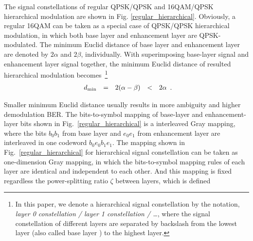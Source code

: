 \documentclass[10pt,fleqn, twocolumn]{IEEEtran}
\begin{document}
The signal constellations of regular QPSK/QPSK and 16QAM/QPSK
hierarchical modulation are shown in Fig.
\ref{regular_hierarchical}. Obviously, a regular 16QAM can be
taken as a special case of QPSK/QPSK hierarchical modulation, in
which both base layer and enhancement layer are QPSK-modulated.
The minimum Euclid distance of base layer and enhancement layer
are denoted by $2\alpha$ and $2\beta$, individually. With
superimposing base-layer signal and enhancement layer signal
together, the minimum Euclid distance of resulted hierarchical
modulation becomes~\footnote{In this paper, we denote a
hierarchical signal constellation by the notation, {\em layer 0
constellation / layer 1 constellation / \ldots}, where the signal
constellation of different layers are separated by backslash from
the lowest layer (also called base layer ) to the highest layer. }
\begin{equation}
\begin{array}{rcccl}
d_{\rm min}& = & 2(\alpha-\beta) & <& 2\alpha
\end{array}.\label{Regular_MED}
\end{equation}
\begin{figure}
\end{figure}
\noindent Smaller minimum Euclid distance usually results in more
ambiguity and higher demodulation BER. The bits-to-symbol mapping
of base-layer and enhancement-layer bits shown in
Fig.~\ref{regular_hierarchical} is a interleaved Gray mapping,
where the bits $b_{0}b_{1}$ from base layer and $e_{0}e_{1}$ from
enhancement layer are interleaved in one codeword
$b_{0}e_{0}b_{1}e_{1}$. The mapping shown in
Fig.~\ref{regular_hierarchical} for hierarchical signal
constellation can be taken as one-dimension Gray mapping, in which
the bits-to-symbol mapping rules of each layer are identical and
independent to each other. And this mapping is fixed regardless
the power-splitting ratio $\zeta$ between layers, which is defined
\end{document}
